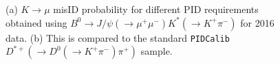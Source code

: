 \begin{figure}[h!]
		\caption{(a) $K \rightarrow \mu$ misID probability for different PID requirements obtained using $B^{0} \rightarrow J/\psi(\rightarrow \mu^{+} \mu^{-}) K^{*} (\rightarrow {K^{+} \pi^{-}} )$ for 2016 data. (b) This is compared to the standard \texttt{PIDCalib} $D^{*+}(\rightarrow D^{0}(\rightarrow K^{+} \pi^{-}) \pi^{+})$ sample. }
		\label{fig:JpsiKaonnew2016}
\end{figure}


